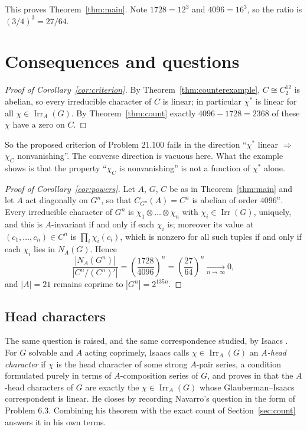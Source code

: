 \documentclass[11pt,a4paper,reqno]{amsart}
\theoremstyle{definition}
\theoremstyle{remark}
\newcommand{\Irr}{\operatorname{Irr}}
\begin{document}
This proves Theorem~\ref{thm:main}.  Note $1728=12^3$ and $4096=16^3$,
so the ratio is $(3/4)^3=27/64$.

\section{Consequences and questions}\label{sec:consequences}

\begin{proof}[Proof of Corollary~\ref{cor:criterion}]
By Theorem~\ref{thm:counterexample}, $C\cong C_2^{12}$ is abelian, so
every irreducible character of $C$ is linear; in particular $\chi^*$ is
linear for all $\chi\in\Irr_A(G)$.  By Theorem~\ref{thm:count} exactly
$4096-1728=2368$ of these $\chi$ have a zero on $C$.
\end{proof}

So the proposed criterion of Problem 21.100 fails in the
direction ``$\chi^*$ linear $\Rightarrow$ $\chi_C$ nonvanishing''.  The
converse direction is vacuous here.  What the example shows is that the
property ``$\chi_C$ is nonvanishing'' is not a function of $\chi^*$
alone.

\begin{proof}[Proof of Corollary~\ref{cor:powers}]
Let $A$, $G$, $C$ be as in Theorem~\ref{thm:main} and let $A$ act
diagonally on $G^n$, so that $C_{G^n}(A)=C^n$ is abelian of order
$4096^n$.  Every irreducible character of $G^n$ is
$\chi_1\otimes\dots\otimes\chi_n$ with $\chi_i\in\Irr(G)$, uniquely, and
this is $A$-invariant if and only if each $\chi_i$ is; moreover its
value at $(c_1,\dots,c_n)\in C^n$ is $\prod_i\chi_i(c_i)$, which is
nonzero for all such tuples if and only if each $\chi_i$ lies in
$N_A(G)$.  Hence
\[
 \frac{|N_A(G^n)|}{|C^n/(C^n)'|}
 =\left(\frac{1728}{4096}\right)^{\!n}
 =\left(\frac{27}{64}\right)^{\!n}
 \xrightarrow[n\to\infty]{}0 ,
\]
and $|A|=21$ remains coprime to $|G^n|=2^{135n}$.
\end{proof}

\subsection*{Head characters}

The same question is raised, and the same
correspondence studied, by Isaacs \cite{isaacs-carter}.  For $G$
solvable and $A$ acting coprimely, Isaacs calls $\chi\in\Irr_A(G)$ an
\emph{$A$-head character} if $\chi$ is the head character of some strong
$A$-pair series, a condition formulated purely in terms of
$A$-composition series of $G$, and proves in
\cite[Theorem 7.1]{isaacs-carter} that the $A$-head characters of $G$
are exactly the $\chi\in\Irr_A(G)$ whose Glauberman--Isaacs
correspondent is linear.  He closes \cite[\S7]{isaacs-carter} by
recording Navarro's question in the form of Problem 6.3.  Combining his
theorem with the exact count of Section~\ref{sec:count} answers it in
his own terms.
\end{document}
